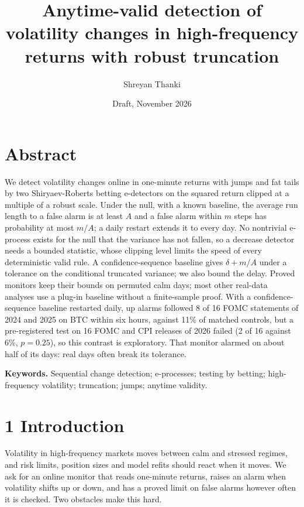 \documentclass[
]{article}
\title{Anytime-valid detection of volatility changes in high-frequency
returns with robust truncation}
\author{Shreyan Thanki}
\date{Draft, November 2026}
\begin{document}
\maketitle

\hypertarget{abstract}{%
\section{Abstract}\label{abstract}}

We detect volatility changes online in one-minute returns with jumps and
fat tails by two Shiryaev-Roberts betting e-detectors on the squared
return clipped at a multiple of a robust scale. Under the null, with a
known baseline, the average run length to a false alarm is at least
\(A\) and a false alarm within \(m\) steps has probability at most
\(m/A\); a daily restart extends it to every day. No nontrivial
e-process exists for the null that the variance has not fallen, so a
decrease detector needs a bounded statistic, whose clipping level limits
the speed of every deterministic valid rule. A confidence-sequence
baseline gives \(\delta + m/A\) under a tolerance on the conditional
truncated variance; we also bound the delay. Proved monitors keep their
bounds on permuted calm days; most other real-data analyses use a
plug-in baseline without a finite-sample proof. With a
confidence-sequence baseline restarted daily, up alarms followed 8 of 16
FOMC statements of 2024 and 2025 on BTC within six hours, against 11\%
of matched controls, but a pre-registered test on 16 FOMC and CPI
releases of 2026 failed (2 of 16 against 6\%, \(p = 0.25\)), so this
contrast is exploratory. That monitor alarmed on about half of its days:
real days often break its tolerance.

\textbf{Keywords.} Sequential change detection; e-processes; testing by
betting; high-frequency volatility; truncation; jumps; anytime validity.

\hypertarget{introduction}{%
\section{1 Introduction}\label{introduction}}

Volatility in high-frequency markets moves between calm and stressed
regimes, and risk limits, position sizes and model refits should react
when it moves. We ask for an online monitor that reads one-minute
returns, raises an alarm when volatility shifts up or down, and has a
proved limit on false alarms however often it is checked. Two obstacles
make this hard.
\end{document}
